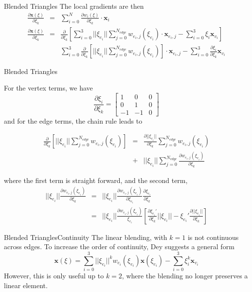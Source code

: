 \documentclass[12pt]{beamer}
\begin{document}
\begin{frame}{Blended Triangles}
The local gradients are then
\begin{eqnarray*}\frac{\partial \mathbf{x}(\xi)}{\partial \xi_k}& = & \sum_{i=0}^N \frac{\partial w_i(\xi)}{\partial \xi_k} \cdot \mathbf{x}_i \\
\frac{\partial \mathbf{x}(\xi)}{\partial \xi_k}& = & \frac{\partial}{\partial \xi_k}\left[\sum_{i=0}^{3}||\xi_{e_i}||\sum_{j=0}^{N_{edge}}w_{e_i,j}(\xi_{e_i})\cdot\mathbf{x}_{e_i,j}- \sum_{i=0}^{3}\xi_i\mathbf{x}_{v_i}\right] \\ & & 
\sum_{i=0}^{3}\frac{\partial}{\partial \xi_k}\left[||\xi_{e_i}||\sum_{j=0}^{N_{edge}}w_{e_i,j}(\xi_{e_i})\right]\cdot\mathbf{x}_{e_i,j}- \sum_{i=0}^{3} \frac{\partial \xi_i}{\partial \xi_k}\mathbf{x}_{v_i}\end{eqnarray*}
\end{frame}
\begin{frame}{Blended Triangles}
{
  \footnotesize
For the vertex terms, we have
\[ \frac{\partial \xi_i}{\partial \xi_k} = \left[ \begin{array}{ccc} 1 & 0 & 0 \\ 0 & 1 & 0 \\ -1 & -1 & 0 \end{array}\right]\]
and for the edge terms, the chain rule leads to


\begin{eqnarray*}
\frac{\partial}{\partial \xi_k}\left[||\xi_{e_i}||\sum_{j=0}^{N_{edge}}w_{e_i,j}(\xi_{e_i})\right] & = & \frac{\partial ||\xi_{e_i}||}{\partial \xi_k}\sum_{j=0}^{N_{edge}}w_{e_i,j}(\xi_{e_i}) \\ & + & ||\xi_{e_i}||\sum_{j=0}^{N_{edge}}\frac{\partial w_{e_i,j}(\xi_{e_i})}{\partial \xi_k}
\end{eqnarray*}

where the first term is straight forward, and the second term, 
\begin{eqnarray*}
||\xi_{e_i}||\frac{\partial w_{e_i,j}(\xi_{e_i})}{\partial \xi_k} & = &
||\xi_{e_i}||\frac{\partial w_{e_i,j}(\xi_{e_i})}{\partial \xi_{e_i}}\frac{\partial \xi_{e_i}}{\partial \xi_k} 
\\ & = & 
||\xi_{e_i}||\frac{\partial w_{e_i,j}(\xi_{e_i})}{\xi_{e_i}}\left[\frac{\partial \xi_{e_i}'}{\partial \xi_k}||\xi_{e_i}||-\xi_{e_i}'\frac{\partial ||\xi_{e_i}||}{\partial \xi_k} \right]
\end{eqnarray*}
}
\end{frame}
\begin{frame}{Blended Triangles}{Continuity}
The linear blending, with $k = 1$ is not continuous across edges. To increase the order of continuity, Dey suggests a general form
\[\mathbf{x}(\xi) = \sum_{i=0}^{3}||\xi_{e_i}||^kw_{e_i}(\xi_{e_i})\mathbf{x}(\xi_{e_i}) - \sum_{i=0}^{3}\xi_i^k\mathbf{x}_{v_i}\]
However, this is only useful up to $k = 2$, where the blending no longer preserves a linear element.
\end{frame}
\end{document}

